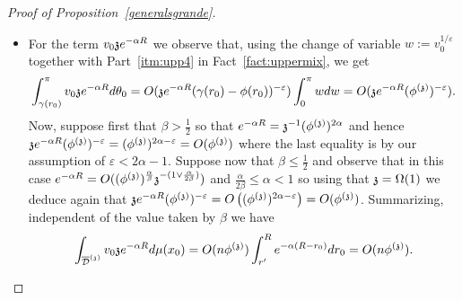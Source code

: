 \begin{proof}[Proof of Proposition~\ref{generalsgrande}]
\begin{itemize}
\smallskip
For the case $\beta>\frac{1}{2}$ we have $\phis=e^{-\frac12 R}\ss^{\frac{1}{2\alpha}}$ and we still need to handle the case $\frac{\alpha}{\beta}\le 1$. If $\frac{\alpha}{\beta}<1$, we have
\[ne^{-\alpha R}\int_{r'}^R\int_{\gamma(r_0)}^\pi (\theta_0-\phi(r_0))^{-\frac{\alpha}{\beta}}d\theta_0dr_0\,=\,O\big(ne^{-\alpha R}R\big),\]
and in it is easily checked that since $\alpha>\frac12$ and by the definition of $\phis$  we have $ne^{-\alpha R}R=O(n\phis e^{(\frac{1}{2}-\alpha)R}R)=O(n\phis)$. Finally, if $\frac{\alpha}{\beta}=1$ we have
\[ne^{-\alpha R}\int_{r'}^R\int_{\gamma(r_0)}^\pi (\theta_0-\phi(r_0))^{-\frac{\alpha}{\beta}}d\theta_0dr_0\,=\,O\Big(ne^{-\alpha R}\int_{r'}^R\log\big(\tfrac{\pi}{\gamma(r_0){-}\phi(r_0)}\big)dr_0\Big)\]
where using Part~\eqref{itm:upp1} in Fact~\ref{fact:uppermix} we conclude that the right-hand term is at most of order $ne^{-\alpha R}R\log(1/\phis)=O(ne^{-\alpha R}R^2)=O(n\phis)$.

\item For the term $v_0\ss e^{-\alpha R}$ we observe that, using the change of variable
  $w:=v_0^{1/\varepsilon}$ together with Part~\eqref{itm:upp4} in Fact~\ref{fact:uppermix}, we get
\[
\int_{\gamma(r_0)}^{\pi} v_0\ss e^{-\alpha R}d\theta_0 
= O(\ss e^{-\alpha R}(\gamma(r_0)-\phi(r_0))^{-\varepsilon})\int_{0}^{\pi} w dw
= O(\ss e^{-\alpha R}(\phis)^{-\varepsilon}).
\]
Now, suppose first that $\beta>\frac{1}{2}$ so that $e^{-\alpha R}=\ss^{-1}(\phis)^{2\alpha}$ and hence $\ss e^{-\alpha R}(\phis)^{-\varepsilon}=(\phis)^{2\alpha-\varepsilon}=O(\phis)$ where the last equality 
is by our assumption of $\varepsilon<2\alpha-1$. Suppose now that $\beta\leq \frac{1}{2}$ and observe that in this case $e^{-\alpha R}=O((\phis)^{\frac{\alpha}{\beta}}\ss^{-(1\vee\frac{\alpha}{2\beta})})$ 
and $\frac{\alpha}{2\beta}\leq\alpha<1$ so using that $\ss=\Omega(1)$ we deduce again that
$\ss e^{-\alpha R}(\phis)^{-\varepsilon}=O\left((\phis)^{2\alpha-\varepsilon}\right)=O(\phis)$.
Summarizing, independent of the value taken by $\beta$ we have
\[
\int_{\ndt}v_0\ss e^{-\alpha R}d\mu(x_0) = O(n\phis)\int_{r'}^R e^{-\alpha(R-r_0)}dr_0 = O(n\phis).
\]


\end{itemize}
\end{proof}
